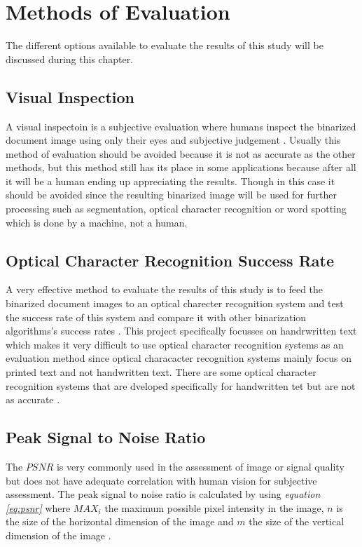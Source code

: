 \documentclass[11pt]{article}
\begin{document}
    \section{Methods of Evaluation}
		The different options available to evaluate the results of this study will be discussed during this chapter.

		\subsection{Visual Inspection}
		A visual inspectoin is a subjective evaluation where humans inspect the binarized document image using only their eyes and subjective judgement \cite{ntirogiannis2013performance}. Usually this method of evaluation should be avoided because it is not as accurate as the other methods, but this method still has its place in some applications because after all it will be a human ending up appreciating the results. Though in this case it should be avoided since the resulting binarized image will be used for further processing such as segmentation, optical character recognition or word spotting which is done by a machine, not a human.

		\subsection{Optical Character Recognition Success Rate}
			A very effective method to evaluate the results of this study is to feed the binarized document images to an optical charecter recognition system and test the success rate of this system and compare it with other binarization algorithms's success rates \cite{chen2017broken}. This project specifically focusses on handrwritten text which makes it very difficult to use optical character recognition systems as an evaluation method since optical characacter recognition systems mainly focus on printed text and not handwritten text. There are some optical character recognition systems that are dveloped specifically for handwritten tet but are not as accurate \cite{ntirogiannis2013performance}.

		\subsection{Peak Signal to Noise Ratio}
		The $PSNR$ is very commonly used in the assessment of image or signal quality but does not have adequate correlation with human vision for subjective assessment. The peak signal to noise ratio is calculated by using \textit{equation \ref{eq:psnr}} where $MAX_i$ the maximum possible pixel intensity in the image, $n$ is the size of the horizontal dimension of the image and $m$ the size of the vertical dimension of the image \cite{liu2017free}.
\end{document}
